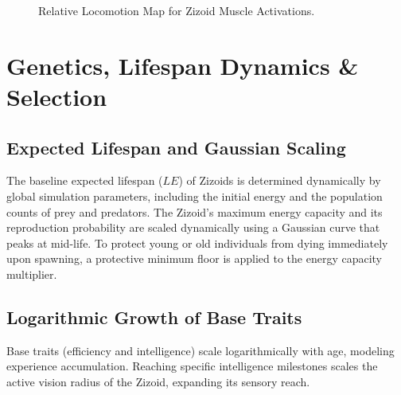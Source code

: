 \documentclass[11pt,a4paper]{article}
\begin{document}
\begin{figure}[ht]
\centering
{}
\caption{Relative Locomotion Map for Zizoid Muscle Activations.}
\label{fig:locomotion}
\end{figure}

\section{Genetics, Lifespan Dynamics \& Selection}

\subsection{Expected Lifespan and Gaussian Scaling}
The baseline expected lifespan ($LE$) of Zizoids is determined dynamically by global simulation parameters, including the initial energy and the population counts of prey and predators. The Zizoid's maximum energy capacity and its reproduction probability are scaled dynamically using a Gaussian curve that peaks at mid-life. To protect young or old individuals from dying immediately upon spawning, a protective minimum floor is applied to the energy capacity multiplier.

\subsection{Logarithmic Growth of Base Traits}
Base traits (efficiency and intelligence) scale logarithmically with age, modeling experience accumulation. Reaching specific intelligence milestones scales the active vision radius of the Zizoid, expanding its sensory reach.
\end{document}

